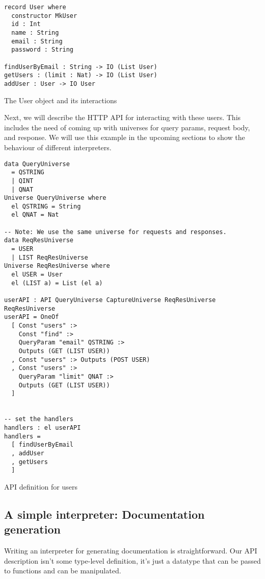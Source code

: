 \documentclass[12pt,a4paper]{article}
\begin{document}
\begin{listing}[H]
\begin{verbatim}
record User where
  constructor MkUser
  id : Int
  name : String
  email : String
  password : String

findUserByEmail : String -> IO (List User)
getUsers : (limit : Nat) -> IO (List User)
addUser : User -> IO User
\end{verbatim}
\label{code:domain}
\caption{The User object and its interactions}
\end{listing}

Next, we will describe the HTTP API for interacting with these users.  This includes
the need of coming up with universes for query params, request body, and response. We will use this example in the upcoming sections
to show the behaviour of different interpreters.

\begin{listing}[H]
\begin{verbatim}
data QueryUniverse
  = QSTRING
  | QINT
  | QNAT
Universe QueryUniverse where
  el QSTRING = String
  el QNAT = Nat

-- Note: We use the same universe for requests and responses.
data ReqResUniverse
  = USER
  | LIST ReqResUniverse
Universe ReqResUniverse where
  el USER = User
  el (LIST a) = List (el a)

userAPI : API QueryUniverse CaptureUniverse ReqResUniverse ReqResUniverse
userAPI = OneOf
  [ Const "users" :>
    Const "find" :>
    QueryParam "email" QSTRING :>
    Outputs (GET (LIST USER))
  , Const "users" :> Outputs (POST USER)
  , Const "users" :>
    QueryParam "limit" QNAT :>
    Outputs (GET (LIST USER))
  ]


-- set the handlers
handlers : el userAPI
handlers =
  [ findUserByEmail
  , addUser
  , getUsers
  ]

\end{verbatim}
\label{code:api}
\caption{API definition for users}
\end{listing}

\subsection{A simple interpreter: Documentation generation}
Writing an interpreter for generating documentation is straightforward. Our API description isn't some type-level definition, it's just a datatype that can be passed to functions and can be manipulated.
\end{document}
